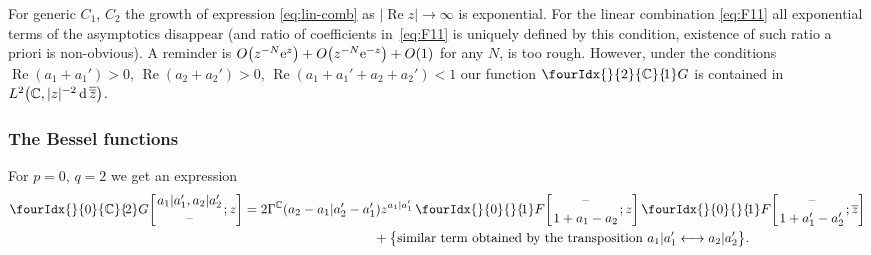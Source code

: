 \documentclass[pdftex]{sigma}
\numberwithin{equation}{section}
\renewcommand{\Re}{\mathop {\mathrm {Re}}\nolimits}
\newcommand{\hyp}[2]{\fourIdx{}{#1}{}{\!#2}F}
\newcommand{\Gc}[2]{\fourIdx{}{#1}{\C}{\!#2}G}
\def\ov{\overline}
\renewcommand{\Re}{\mathop {\mathrm {Re}}\nolimits}
\def\C {{\mathbb C }}
\newcommand{\dd}[1]{\,{\rm d}\,{\overline{\overline{#1}}} }
\begin{document}
For generic $C_1$, $C_2$ the growth of expression \eqref{eq:lin-comb}
as $|\Re z|\to \infty$ is exponential.
For the linear combination \eqref{eq:F11} all exponential terms of the
asymptotics disappear (and ratio of coefficients in~\eqref{eq:F11}
is uniquely defined by this condition, existence of such ratio a priori
is non-obvious).
A reminder is $O\big(z^{-N} {\rm e}^{z}\big)+O\big(z^{-N} {\rm e}^{-z}\big) +O(1)$ for any $N$,
is too rough.
However, under the conditions $\Re(a_1+a_1')>0$, $\Re(a_2+a_2')>0$,
$\Re(a_1+a_1'+a_2+a_2')<1$ our function $\Gc{2}{1}$ is contained in
$L^2\big(\C,|z|^{-2}\dd z\big)$.

\subsubsection{The Bessel functions}
For $p=0$, $q=2$ we get an expression
\begin{gather*}
 \Gc{0}{2}\!\left[\genfrac{}{}{0pt}{}{a_1|a_1',a_2|a_2'}{\text{--}};z\right]
 =2 \Gamma^\C(a_2-a_1|a_2'-a_1') z^{a_1|a_1'}
\,
\hyp{0}{1}\!\left[\genfrac{}{}{0pt}{}{\text{--}}{1+a_1-a_2};z\right]
\hyp{0}{1}\!\left[\genfrac{}{}{0pt}{}{\text{--}}{1+a_1'-a_2'};\ov z\right] \\
\hphantom{\Gc{0}{2}\!\left[\genfrac{}{}{0pt}{}{a_1|a_1',a_2|a_2'}{\text{--}};z\right]=}{}
+\big\{\text{similar term obtained by the transposition
$a_1|a_1'\longleftrightarrow a_2|a_2'$}\big\}.
\end{gather*}
\end{document}
